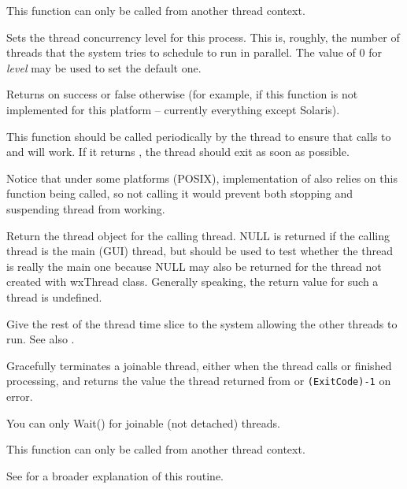 This function can only be called from another thread context.


\label{wxthreadsetconcurrency}


Sets the thread concurrency level for this process. This is, roughly, the
number of threads that the system tries to schedule to run in parallel.
The value of $0$ for {\it level} may be used to set the default one.

Returns \true on success or false otherwise (for example, if this function is
not implemented for this platform -- currently everything except Solaris).


\label{wxthreadtestdestroy}


This function should be called periodically by the thread to ensure that calls
to  and  will
work. If it returns \true, the thread should exit as soon as possible.

Notice that under some platforms (POSIX), implementation of 
 also relies on this function being called, so
not calling it would prevent both stopping and suspending thread from working.


\label{wxthreadthis}


Return the thread object for the calling thread. NULL is returned if the calling thread
is the main (GUI) thread, but  should be used to test
whether the thread is really the main one because NULL may also be returned for the thread
not created with wxThread class. Generally speaking, the return value for such a thread
is undefined.


\label{wxthreadyield}


Give the rest of the thread time slice to the system allowing the other threads to run.
See also .


\label{wxthreadwait}


Gracefully terminates a joinable thread, either when the thread calls 
 or finished processing, and 
returns the value the thread returned from 
 or {\tt (ExitCode)-1} on error. 

You can only Wait() for joinable (not detached) threads.

This function can only be called from another thread context.

See  for a broader explanation of this routine.

